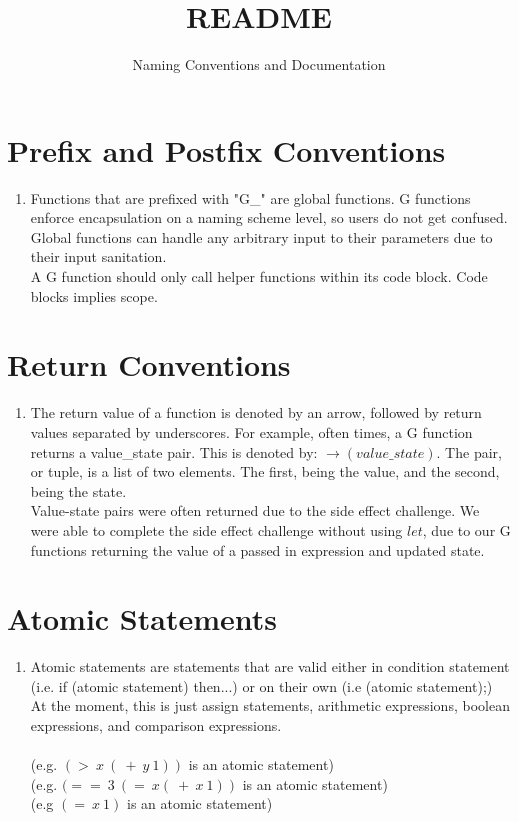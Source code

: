 \documentclass{article}
\title{README}
\author{Naming Conventions and Documentation }
\date{}
\begin{document}
\maketitle

\section{Prefix and Postfix Conventions}
\begin{enumerate}
    \item Functions that are prefixed with "G\_" are global functions. G functions enforce encapsulation on a naming scheme level, so users do not get confused. Global functions can handle any arbitrary input to their parameters due to their input sanitation. \\
    
    A G function should only call helper functions within its code block. Code blocks implies scope.
    
\end{enumerate}

\section{Return Conventions}
\begin{enumerate}
\item The return value of a function is denoted by an arrow, followed by return values separated by underscores. For example, often times, a G function returns a value\_state pair. This is denoted by: $\rightarrow (value\_state)$. The pair, or tuple, is a list of two elements. The first, being the value, and the second, being the state. \\

Value-state pairs were often returned due to the side effect challenge. We were able to complete the side effect challenge without using $let$, due to our G functions returning the value of a passed in expression and updated state. \\
\end{enumerate}

\section{Atomic Statements}
\begin{enumerate}
    \item Atomic statements are statements that are valid either in condition statement (i.e. if (atomic statement) then...) or on their own (i.e (atomic statement);) At the moment, this is just assign statements, arithmetic expressions, boolean expressions, and comparison expressions.\\~\\
(e.g. $(>\ x\ (\ +\ y\ 1))$ is an atomic statement) \\
(e.g. $(==\ 3\ (=\ x (\ +\ x\ 1))$ is an atomic statement)\\
(e.g $(=\ x\ 1)$ is an atomic statement)
\end{enumerate}
\end{document}
